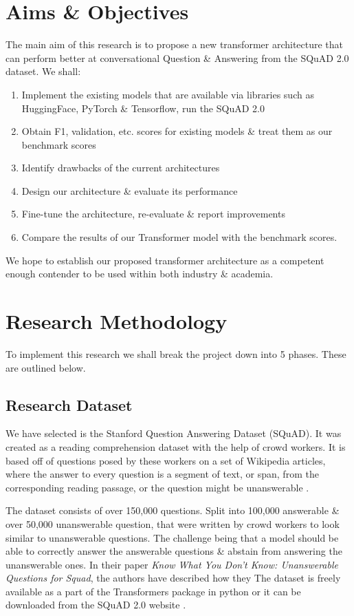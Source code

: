 \documentclass[11pt]{article}
\begin{document}
	\newpage
	\newpage
	\section{Aims \& Objectives}\label{aims}
	
	The main aim of this research is to propose a new transformer architecture that can perform better at conversational Question \& Answering from the SQuAD 2.0 dataset\citep{dataset}.
	We shall:
	\begin{enumerate}
		\item Implement the existing models that are available via libraries such as HuggingFace\citep{hfTransformers}, PyTorch \& Tensorflow, run the SQuAD 2.0\citep{dataset}
		\item Obtain F1, validation, etc. scores for existing models \& treat them as our benchmark scores
		\item Identify drawbacks of the current architectures
		\item Design our architecture \& evaluate its performance
		\item Fine-tune the architecture, re-evaluate \& report improvements
		\item Compare the results of our Transformer model with the benchmark scores.
	\end{enumerate}
	We hope to establish our proposed transformer architecture as a competent enough contender to be used within both industry \& academia.
	\section{Research Methodology}\label{researchMeth}
	
	To implement this research we shall break the project down into 5 phases. These are outlined below.
	\subsection{Research Dataset}\label{datas}
	
	We have selected is the Stanford Question Answering Dataset (SQuAD). It was created as a reading comprehension dataset with the help of crowd workers. It is based off of questions posed by these workers on a set of Wikipedia articles, where the answer to every question is a segment of text, or span, from the corresponding reading passage, or the question might be unanswerable \citep{dataset}.
	
	The dataset consists of over 150,000 questions. Split into 100,000 answerable \& over 50,000 unanswerable question, that were written by crowd workers to look similar to unanswerable questions. The challenge being that a model should be able to correctly answer the answerable questions \& abstain from answering the unanswerable ones. In their paper \textit{Know What You Don't Know: Unanswerable Questions for Squad}, \cite{dataset} the authors have described how they 
	The dataset is freely available as a part of the Transformers package in python or it can be downloaded from the SQuAD 2.0 website \citep{squad}.
	
\end{document}

